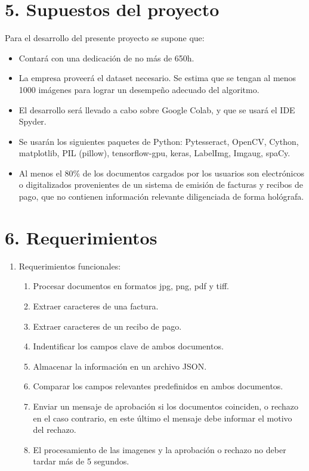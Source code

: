 \documentclass[
11pt, %
]{charter}
\begin{document}
\begin{•}
\section{5. Supuestos del proyecto}
\label{sec:supuestos}

\begin{•}%
Para el desarrollo del presente proyecto se supone que:

\begin{itemize}
	\item Contará con una dedicación de no más de 650h.
	\item La empresa proveerá el dataset necesario. Se estima que se tengan al menos 1000 imágenes para lograr un desempeño adecuado del algoritmo.
	\item El desarrollo será llevado a cabo sobre Google Colab, y que se usará el IDE Spyder.
	\item Se usarán los siguientes paquetes de Python: Pytesseract, OpenCV, Cython, matplotlib, PIL (pillow), tensorflow-gpu, keras, LabelImg, Imgaug, spaCy.
	\item Al menos el 80\% de los documentos cargados por los usuarios son electrónicos o digitalizados provenientes de un sistema de emisión de facturas y recibos de pago, que no contienen información relevante diligenciada de forma hológrafa. 
\end{itemize}

\end{•}

\section{6. Requerimientos}
\label{sec:requerimientos}

\begin{enumerate}
	
	\item Requerimientos funcionales:
		\begin{enumerate}
		\item Procesar documentos en formatos jpg, png, pdf y tiff.
		\item Extraer caracteres de una factura.
		\item Extraer caracteres de un recibo de pago.
		\item Indentificar los campos clave de ambos documentos.
		\item Almacenar la información en un archivo JSON.
		\item Comparar los campos relevantes predefinidos en ambos documentos.
		\item Enviar un mensaje de aprobación si los documentos coinciden, o rechazo en el caso contrario, en este último el mensaje debe informar el motivo del rechazo.
		\item El procesamiento de las imagenes y la aprobación o rechazo no deber tardar más de 5 segundos.
		

\end{enumerate}
\end{enumerate}
\end{•}
\end{document}
